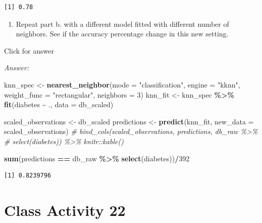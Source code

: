 \documentclass[
]{book}
\newenvironment{Shaded}{\begin{snugshade}}{\end{snugshade}}
\newcommand{\AttributeTok}[1]{\textcolor[rgb]{0.13,0.29,0.53}{#1}}
\newcommand{\CommentTok}[1]{\textcolor[rgb]{0.56,0.35,0.01}{\textit{#1}}}
\newcommand{\DecValTok}[1]{\textcolor[rgb]{0.00,0.00,0.81}{#1}}
\newcommand{\FunctionTok}[1]{\textcolor[rgb]{0.13,0.29,0.53}{\textbf{#1}}}
\newcommand{\NormalTok}[1]{#1}
\newcommand{\OtherTok}[1]{\textcolor[rgb]{0.56,0.35,0.01}{#1}}
\newcommand{\SpecialCharTok}[1]{\textcolor[rgb]{0.81,0.36,0.00}{\textbf{#1}}}
\newcommand{\StringTok}[1]{\textcolor[rgb]{0.31,0.60,0.02}{#1}}
\providecommand{\tightlist}{%
  \setlength{\itemsep}{0pt}\setlength{\parskip}{0pt}}
\begin{document}
\begin{verbatim}
[1] 0.78
\end{verbatim}

\begin{enumerate}
\def\labelenumi{\alph{enumi}.}
\setcounter{enumi}{2}
\tightlist
\item
  Repeat part b. with a different model fitted with different number of neighbors. See if the accuracy percentage change in this new setting.
\end{enumerate}

Click for answer

\emph{Answer:}

\begin{Shaded}
\begin{Highlighting}[]
\NormalTok{knn\_spec }\OtherTok{\textless{}{-}} \FunctionTok{nearest\_neighbor}\NormalTok{(}\AttributeTok{mode =} \StringTok{"classification"}\NormalTok{,}
                             \AttributeTok{engine =} \StringTok{"kknn"}\NormalTok{,}
                             \AttributeTok{weight\_func =} \StringTok{"rectangular"}\NormalTok{,}
                             \AttributeTok{neighbors =} \DecValTok{3}\NormalTok{)}
\NormalTok{knn\_fit }\OtherTok{\textless{}{-}}\NormalTok{ knn\_spec }\SpecialCharTok{\%\textgreater{}\%}
 \FunctionTok{fit}\NormalTok{(diabetes }\SpecialCharTok{\textasciitilde{}}\NormalTok{ ., }\AttributeTok{data =}\NormalTok{ db\_scaled)}

\NormalTok{scaled\_observations }\OtherTok{\textless{}{-}}\NormalTok{ db\_scaled}
\NormalTok{predictions }\OtherTok{\textless{}{-}} \FunctionTok{predict}\NormalTok{(knn\_fit, }\AttributeTok{new\_data =}\NormalTok{ scaled\_observations)}
\CommentTok{\# bind\_cols(scaled\_observations, predictions, db\_raw \%\textgreater{}\% }
\CommentTok{\#            select(diabetes)) \%\textgreater{}\% knitr::kable()}

\FunctionTok{sum}\NormalTok{(predictions }\SpecialCharTok{==}\NormalTok{ db\_raw }\SpecialCharTok{\%\textgreater{}\%} \FunctionTok{select}\NormalTok{(diabetes))}\SpecialCharTok{/}\DecValTok{392}
\end{Highlighting}
\end{Shaded}

\begin{verbatim}
[1] 0.8239796
\end{verbatim}

\hypertarget{class-activity-22}{%
\chapter{Class Activity 22}\label{class-activity-22}}
\end{document}
